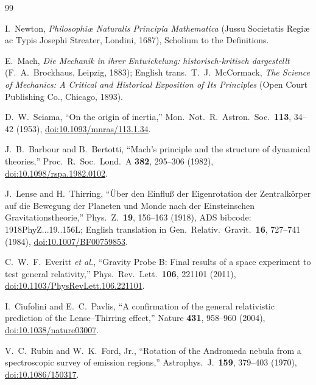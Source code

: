 \documentclass[aps,reprint,amsmath,amssymb,nofootinbib,superscriptaddress,floatfix]{revtex4-2}
\begin{document}
\begin{thebibliography}{99}

I.~Newton, \emph{Philosophi\ae{} Naturalis Principia Mathematica}
(Jussu Societatis Regi\ae{} ac Typis Josephi Streater, Londini, 1687),
Scholium to the Definitions.

E.~Mach, \emph{Die Mechanik in ihrer Entwickelung:
historisch-kritisch dargestellt} (F.~A.~Brockhaus, Leipzig, 1883);
English trans.\ T.~J.~McCormack, \emph{The Science of Mechanics:
A Critical and Historical Exposition of Its Principles}
(Open Court Publishing Co., Chicago, 1893).

D.~W.~Sciama, ``On the origin of inertia,''
Mon.\ Not.\ R.\ Astron.\ Soc.\ \textbf{113}, 34--42 (1953),
\href{https://doi.org/10.1093/mnras/113.1.34}
{doi:10.1093/mnras/113.1.34}.

J.~B.~Barbour and B.~Bertotti, ``Mach's principle and the structure of
dynamical theories,''
Proc.\ R.\ Soc.\ Lond.\ A \textbf{382}, 295--306 (1982),
\href{https://doi.org/10.1098/rspa.1982.0102}
{doi:10.1098/rspa.1982.0102}.

J.~Lense and H.~Thirring, ``\"Uber den Einflu\ss{} der Eigenrotation
der Zentralk\"orper auf die Bewegung der Planeten und Monde nach der
Einsteinschen Gravitationstheorie,''
Phys.\ Z.\ \textbf{19}, 156--163 (1918),
ADS bibcode: 1918PhyZ...19..156L; English translation in
Gen.\ Relativ.\ Gravit.\ \textbf{16}, 727--741 (1984),
\href{https://doi.org/10.1007/BF00759853}{doi:10.1007/BF00759853}.

C.~W.~F.~Everitt \emph{et al.}, ``Gravity Probe B: Final results of a
space experiment to test general relativity,''
Phys.\ Rev.\ Lett.\ \textbf{106}, 221101 (2011),
\href{https://doi.org/10.1103/PhysRevLett.106.221101}
{doi:10.1103/PhysRevLett.106.221101}.

I.~Ciufolini and E.~C.~Pavlis, ``A confirmation of the general
relativistic prediction of the Lense--Thirring effect,''
Nature \textbf{431}, 958--960 (2004),
\href{https://doi.org/10.1038/nature03007}{doi:10.1038/nature03007}.

V.~C.~Rubin and W.~K.~Ford, Jr., ``Rotation of the Andromeda nebula
from a spectroscopic survey of emission regions,''
Astrophys.\ J.\ \textbf{159}, 379--403 (1970),
\href{https://doi.org/10.1086/150317}{doi:10.1086/150317}.


\end{thebibliography}
\end{document}

